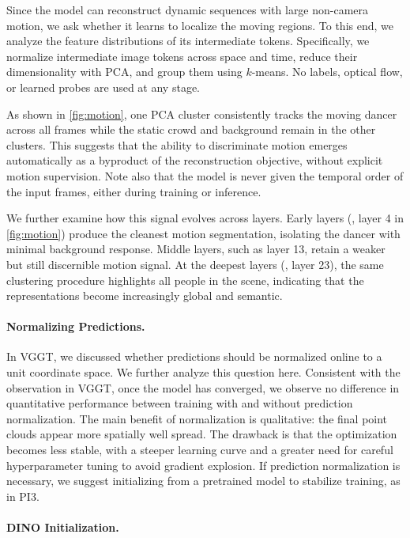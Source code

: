 Since the model can reconstruct dynamic sequences with large non-camera motion, we ask whether it learns to localize the moving regions.
To this end, we analyze the feature distributions of its intermediate tokens.
Specifically, we normalize intermediate image tokens across space and time, reduce their dimensionality with PCA, and group them using $k$-means.
No labels, optical flow, or learned probes are used at any stage.

As shown in \cref{fig:motion}, one PCA cluster consistently tracks the moving dancer across all frames while the static crowd and background remain in the other clusters.
This suggests that the ability to discriminate motion emerges automatically as a byproduct of the reconstruction objective, without explicit motion supervision.
Note also that the model is never given the temporal order of the input frames, either during training or inference.

We further examine how this signal evolves across layers.
Early layers (\eg, layer 4 in \cref{fig:motion}) produce the cleanest motion segmentation, isolating the dancer with minimal background response.
Middle layers, such as layer 13, retain a weaker but still discernible motion signal.
At the deepest layers (\eg, layer 23), the same clustering procedure highlights all people in the scene, indicating that the representations become increasingly global and semantic.

\paragraph{Normalizing Predictions.}

In VGGT, we discussed whether predictions should be normalized online to a unit coordinate space.
We further analyze this question here.
Consistent with the observation in VGGT, once the model has converged, we observe no difference in quantitative performance between training with and without prediction normalization.
The main benefit of normalization is qualitative: the final point clouds appear more spatially well spread. 
The drawback is that the optimization becomes less stable, with a steeper learning curve and a greater need for careful hyperparameter tuning to avoid gradient explosion.
If prediction normalization is necessary, we suggest initializing from a pretrained model to stabilize training, as in PI3.

\paragraph{DINO Initialization.}

